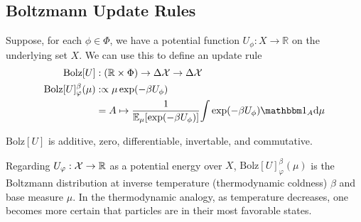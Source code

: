\documentclass{article}
\begin{document}
\subsection{Boltzmann Update Rules}
% 
% 
\def\Bolz#1{\mathrm{Bolz}[#1]}
Suppose, for each $\phi \in \Phi$, we have a potential function $U_\phi : X \to \mathbb R$ on the underlying set $X$. 
We can use this to define an update rule
\begin{align*}
    \Bolz U &: (\mathbb R \times \Phi) \to \Delta\X \to \Delta\X \\
    \Bolz U^\beta_\varphi(\mu) 
        &:\propto
            \mu \exp(-\beta U_\phi) \\
        &= A \mapsto \frac
            1{\Ex_{\mu} [ \exp(-\beta U_\phi)]}
            {\int \exp(-\beta U_\phi) \mathbbm 1_A \mathrm d\mu }
\end{align*}

\begin{prop}
    $\Bolz U$ is additive, zero, differentiable, invertable, and commutative. 
\end{prop}


\begin{remark}
    Regarding $U_\varphi : \mathcal X \to \mathbb R$ as a potential energy over $X$, 
    $\Bolz U^\beta_\varphi(\mu)$ is the Boltzmann distribution at inverse temperature (thermodynamic coldness) $\beta$ and base measure $\mu$.
    In the thermodynamic analogy, as temperature decreases, one becomes more certain that particles are in their most favorable states.
\end{remark}
\end{document}
